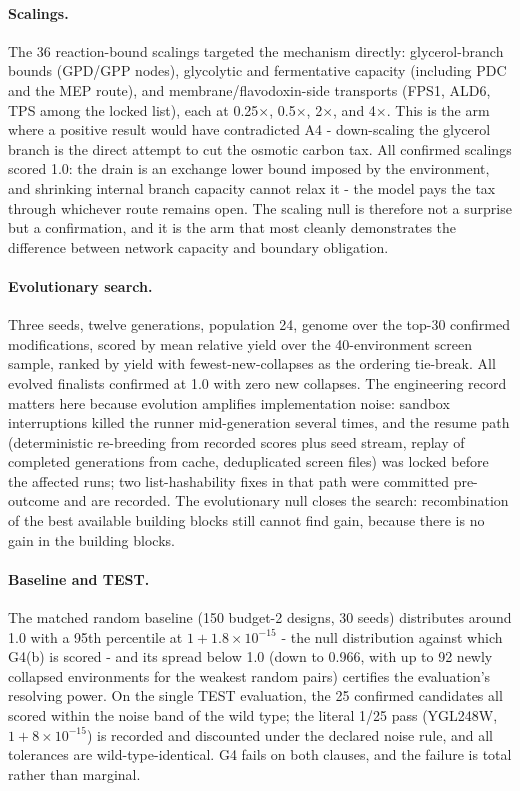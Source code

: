 \documentclass[12pt]{article}
\begin{document}
\paragraph{Scalings.} The 36 reaction-bound scalings targeted the
mechanism directly: glycerol-branch bounds (GPD/GPP nodes),
glycolytic and fermentative capacity (including PDC and the MEP
route), and membrane/flavodoxin-side transports (FPS1, ALD6, TPS
among the locked list), each at 0.25$\times$, 0.5$\times$, 2$\times$,
and 4$\times$. This is the arm where a positive result would have
contradicted A4 - down-scaling the glycerol branch is the direct
attempt to cut the osmotic carbon tax. All confirmed scalings scored
1.0: the drain is an exchange lower bound imposed by the environment,
and shrinking internal branch capacity cannot relax it - the model
pays the tax through whichever route remains open. The scaling null
is therefore not a surprise but a confirmation, and it is the arm
that most cleanly demonstrates the difference between network
capacity and boundary obligation.

\paragraph{Evolutionary search.} Three seeds, twelve generations,
population 24, genome over the top-30 confirmed modifications,
scored by mean relative yield over the 40-environment screen sample, ranked by yield with fewest-new-collapses as the ordering tie-break. All
evolved finalists confirmed at 1.0 with zero new collapses. The
engineering record matters here because evolution amplifies
implementation noise: sandbox interruptions killed the runner
mid-generation several times, and the resume path (deterministic
re-breeding from recorded scores plus seed stream, replay of
completed generations from cache, deduplicated screen files) was
locked before the affected runs; two list-hashability fixes in that
path were committed pre-outcome and are recorded. The evolutionary
null closes the search: recombination of the best available building
blocks still cannot find gain, because there is no gain in the
building blocks.

\paragraph{Baseline and TEST.} The matched random baseline (150
budget-2 designs, 30 seeds) distributes around 1.0 with a 95th
percentile at $1+1.8\times10^{-15}$ - the null distribution against
which G4(b) is scored - and its spread below 1.0 (down to 0.966,
with up to 92 newly collapsed environments for the weakest random
pairs) certifies the evaluation's resolving power. On the single
TEST evaluation, the 25 confirmed candidates all scored within the
noise band of the wild type; the literal 1/25 pass (YGL248W,
$1+8\times10^{-15}$) is recorded and discounted under the declared
noise rule, and all tolerances are wild-type-identical. G4 fails on
both clauses, and the failure is total rather than marginal.
\end{document}
